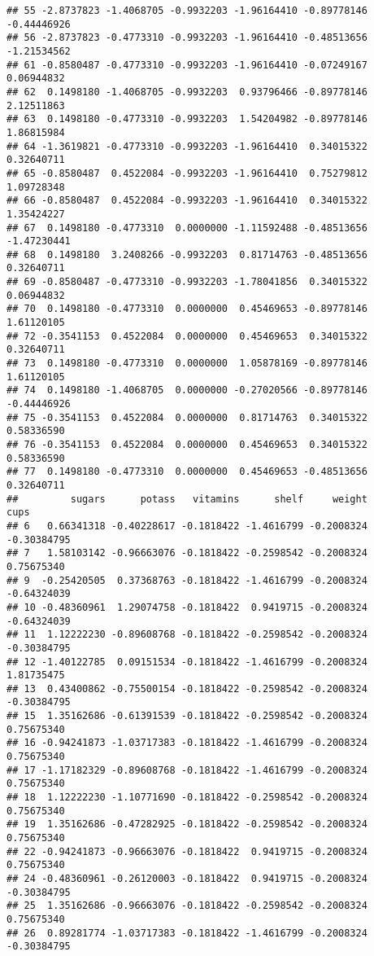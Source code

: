 \documentclass[
]{article}
\begin{document}
\begin{verbatim}
## 55 -2.8737823 -1.4068705 -0.9932203 -1.96164410 -0.89778146 -0.44446926
## 56 -2.8737823 -0.4773310 -0.9932203 -1.96164410 -0.48513656 -1.21534562
## 61 -0.8580487 -0.4773310 -0.9932203 -1.96164410 -0.07249167  0.06944832
## 62  0.1498180 -1.4068705 -0.9932203  0.93796466 -0.89778146  2.12511863
## 63  0.1498180 -0.4773310 -0.9932203  1.54204982 -0.89778146  1.86815984
## 64 -1.3619821 -0.4773310 -0.9932203 -1.96164410  0.34015322  0.32640711
## 65 -0.8580487  0.4522084 -0.9932203 -1.96164410  0.75279812  1.09728348
## 66 -0.8580487  0.4522084 -0.9932203 -1.96164410  0.34015322  1.35424227
## 67  0.1498180 -0.4773310  0.0000000 -1.11592488 -0.48513656 -1.47230441
## 68  0.1498180  3.2408266 -0.9932203  0.81714763 -0.48513656  0.32640711
## 69 -0.8580487 -0.4773310 -0.9932203 -1.78041856  0.34015322  0.06944832
## 70  0.1498180 -0.4773310  0.0000000  0.45469653 -0.89778146  1.61120105
## 72 -0.3541153  0.4522084  0.0000000  0.45469653  0.34015322  0.32640711
## 73  0.1498180 -0.4773310  0.0000000  1.05878169 -0.89778146  1.61120105
## 74  0.1498180 -1.4068705  0.0000000 -0.27020566 -0.89778146 -0.44446926
## 75 -0.3541153  0.4522084  0.0000000  0.81714763  0.34015322  0.58336590
## 76 -0.3541153  0.4522084  0.0000000  0.45469653  0.34015322  0.58336590
## 77  0.1498180 -0.4773310  0.0000000  0.45469653 -0.48513656  0.32640711
##         sugars      potass   vitamins      shelf     weight        cups
## 6   0.66341318 -0.40228617 -0.1818422 -1.4616799 -0.2008324 -0.30384795
## 7   1.58103142 -0.96663076 -0.1818422 -0.2598542 -0.2008324  0.75675340
## 9  -0.25420505  0.37368763 -0.1818422 -1.4616799 -0.2008324 -0.64324039
## 10 -0.48360961  1.29074758 -0.1818422  0.9419715 -0.2008324 -0.64324039
## 11  1.12222230 -0.89608768 -0.1818422 -0.2598542 -0.2008324 -0.30384795
## 12 -1.40122785  0.09151534 -0.1818422 -1.4616799 -0.2008324  1.81735475
## 13  0.43400862 -0.75500154 -0.1818422 -0.2598542 -0.2008324 -0.30384795
## 15  1.35162686 -0.61391539 -0.1818422 -0.2598542 -0.2008324  0.75675340
## 16 -0.94241873 -1.03717383 -0.1818422 -1.4616799 -0.2008324  0.75675340
## 17 -1.17182329 -0.89608768 -0.1818422 -1.4616799 -0.2008324  0.75675340
## 18  1.12222230 -1.10771690 -0.1818422 -0.2598542 -0.2008324  0.75675340
## 19  1.35162686 -0.47282925 -0.1818422 -0.2598542 -0.2008324  0.75675340
## 22 -0.94241873 -0.96663076 -0.1818422  0.9419715 -0.2008324  0.75675340
## 24 -0.48360961 -0.26120003 -0.1818422  0.9419715 -0.2008324 -0.30384795
## 25  1.35162686 -0.96663076 -0.1818422 -0.2598542 -0.2008324  0.75675340
## 26  0.89281774 -1.03717383 -0.1818422 -1.4616799 -0.2008324 -0.30384795

\end{verbatim}
\end{document}
